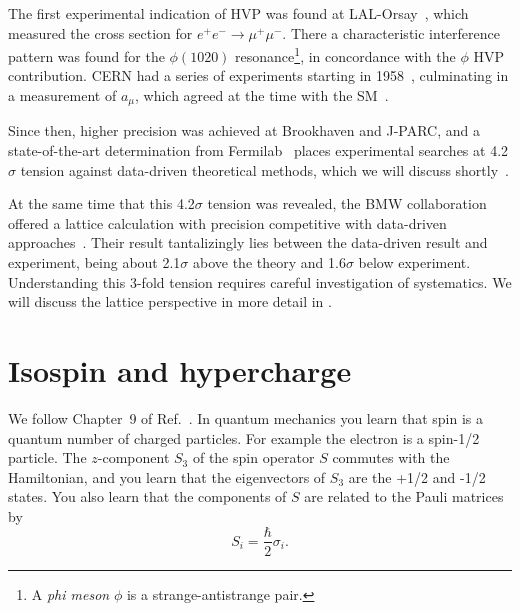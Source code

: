 The first experimental indication of HVP was found at 
LAL-Orsay~\cite{augustin_evidence_1973},
which measured the cross section for $e^+e^-\to\mu^+\mu^-$.
There a characteristic interference pattern was found for
the $\phi(1020)$ resonance\footnote{A {\it phi meson} $\phi$
is a strange-antistrange pair.}, in concordance with the
$\phi$ HVP contribution. CERN had a series of experiments
starting in 
1958~\cite{charpak_measurement_1961,bailey_precise_1971,bailey_anomalous_1977}, 
culminating in a measurement of $a_\mu$, which agreed at the time with the 
SM~\cite{calmet_anomalous_1977}.


Since then, higher precision was achieved at Brookhaven
and J-PARC, and a state-of-the-art determination from 
Fermilab~\cite{abi_measurement_2021}
places experimental searches at 4.2$\sigma$ tension
against data-driven theoretical methods,
which we will discuss shortly~\cite{aoyama_anomalous_2020}.


At the same time that this 4.2$\sigma$ tension was revealed,
the BMW collaboration offered a lattice calculation with precision competitive
with data-driven approaches~\cite{borsanyi_leading_2021}.
Their result tantalizingly lies between the data-driven result and experiment,
being about 2.1$\sigma$ above the theory and 1.6$\sigma$ below experiment.
Understanding this 3-fold tension requires careful investigation of
systematics. We will discuss the lattice perspective
in more detail in . 



\section{Isospin and hypercharge}\label{sec:isohyper}

We follow Chapter~9 of 
Ref.~\cite{thomson_modern_2013}. 
In quantum mechanics you learn that spin is a quantum number of
charged particles. For example the electron is a spin-1/2 particle. The
$z$-component $S_3$ of the spin operator $S$ commutes with the Hamiltonian, and
you learn that the eigenvectors of $S_3$ are the +1/2 and -1/2 states. You also
learn that the components of $S$ are related to the Pauli matrices by
\begin{equation}
  S_i=\frac{\hbar}{2}\sigma_i.
\end{equation}

